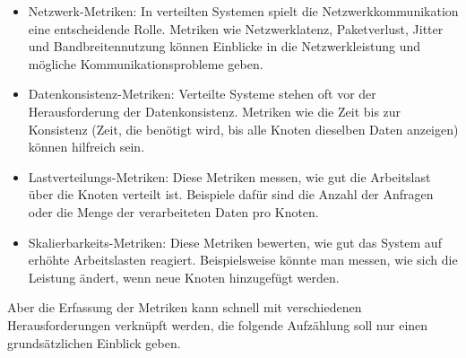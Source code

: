 \begin{itemize}
\item Netzwerk-Metriken: In verteilten Systemen spielt die Netzwerkkommunikation eine entscheidende Rolle. Metriken wie Netzwerklatenz, Paketverlust, Jitter und Bandbreitennutzung können Einblicke in die Netzwerkleistung und mögliche Kommunikationsprobleme geben.
\item Datenkonsistenz-Metriken: Verteilte Systeme stehen oft vor der Herausforderung der Datenkonsistenz. Metriken wie die Zeit bis zur Konsistenz (Zeit, die benötigt wird, bis alle Knoten dieselben Daten anzeigen) können hilfreich sein.
\item Lastverteilungs-Metriken: Diese Metriken messen, wie gut die Arbeitslast über die Knoten verteilt ist. Beispiele dafür sind die Anzahl der Anfragen oder die Menge der verarbeiteten Daten pro Knoten.
\item Skalierbarkeits-Metriken: Diese Metriken bewerten, wie gut das System auf erhöhte Arbeitslasten reagiert. Beispielsweise könnte man messen, wie sich die Leistung ändert, wenn neue Knoten hinzugefügt werden.
\end{itemize}
Aber die Erfassung der Metriken kann schnell mit verschiedenen Herausforderungen verknüpft werden, die folgende Aufzählung soll nur einen grundsätzlichen Einblick geben. 
